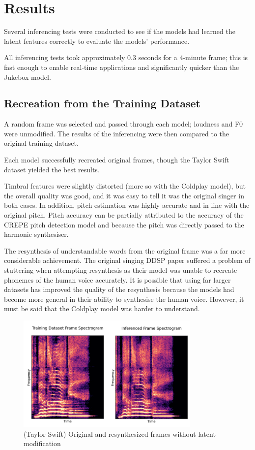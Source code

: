 \section{Results}

Several inferencing tests were conducted to see if the models had learned the latent features correctly to evaluate the models' performance.

All inferencing tests took approximately 0.3 seconds for a 4-minute frame; this is fast enough to enable real-time applications and significantly quicker than the Jukebox model.

\subsection{Recreation from the Training Dataset}

A random frame was selected and passed through each model; loudness and F0 were unmodified. The results of the inferencing were then compared to the original training dataset.

Each model successfully recreated original frames, though the Taylor Swift dataset yielded the best results.

Timbral features were slightly distorted (more so with the Coldplay model), but the overall quality was good, and it was easy to tell it was the original singer in both cases. In addition, pitch estimation was highly accurate and in line with the original pitch. Pitch accuracy can be partially attributed to the accuracy of the CREPE pitch detection model\cite{CREPE} and because the pitch was directly passed to the harmonic synthesiser.

The resynthesis of understandable words from the original frame was a far more considerable achievement. The original singing DDSP paper\cite{SingingDDSP} suffered a problem of stuttering when attempting resynthesis as their model was unable to recreate phonemes of the human voice accurately. It is possible that using far larger datasets has improved the quality of the resynthesis because the models had become more general in their ability to synthesise the human voice. However, it must be said that the Coldplay model was harder to understand.

\begin{figure}[H]
    \centering
    \includegraphics[width=0.8\textwidth]{research/results/TaylorSwift/InferredRecreation.png}
    \caption{(Taylor Swift) Original and resynthesized frames without latent modification}
\end{figure}

